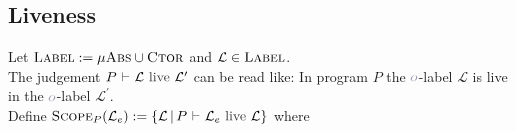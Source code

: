 \begin{prooftree}
\end{prooftree}
\vspace*{0.3cm}

\begin{prooftree}
\end{prooftree}
\vspace*{0.3cm}

\subsection{Liveness}
Let $\textsc{Label} := \mu\textsc{Abs} \cup \textsc{Ctor}$ and $\mathcal{L} \in \textsc{Label}$.
\\
The judgement $\liveness{P}{\mathcal{L}}{\mathcal{L}^{\prime}}$ can be read like: In program $P$ the $\pol$-label $\mathcal{L}$ is live in the $\pol$-label $\mathcal{L}^{\prime}$.
\\
Define $\textsc{Scope}_{P}(\mathcal{L}_{e}) := \lbrace \mathcal{L} \,|\, \liveness{P}{\mathcal{L}_{e}}{\mathcal{L}} \rbrace$ where
\\
\begin{prooftree}
\end{prooftree}
\vspace*{0.3cm}

\begin{prooftree}
\end{prooftree}
\vspace*{0.3cm}

